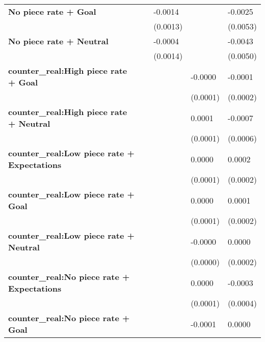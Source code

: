 \begin{tabular}{lllll}
\textbf{No piece rate + Goal                      } &                &        -0.0014 &                &        -0.0025 \\
                                           &                &       (0.0013) &                &       (0.0053) \\
\textbf{No piece rate + Neutral                   } &                &        -0.0004 &                &        -0.0043 \\
                                           &                &       (0.0014) &                &       (0.0050) \\
\textbf{counter\_real:High piece rate + Goal       } &                &                &        -0.0000 &        -0.0001 \\
                                           &                &                &       (0.0001) &       (0.0002) \\
\textbf{counter\_real:High piece rate + Neutral    } &                &                &         0.0001 &        -0.0007 \\
                                           &                &                &       (0.0001) &       (0.0006) \\
\textbf{counter\_real:Low piece rate + Expectations} &                &                &         0.0000 &         0.0002 \\
                                           &                &                &       (0.0001) &       (0.0002) \\
\textbf{counter\_real:Low piece rate + Goal        } &                &                &         0.0000 &         0.0001 \\
                                           &                &                &       (0.0001) &       (0.0002) \\
\textbf{counter\_real:Low piece rate + Neutral     } &                &                &        -0.0000 &         0.0000 \\
                                           &                &                &       (0.0000) &       (0.0002) \\
\textbf{counter\_real:No piece rate + Expectations } &                &                &         0.0000 &        -0.0003 \\
                                           &                &                &       (0.0001) &       (0.0004) \\
\textbf{counter\_real:No piece rate + Goal         } &                &                &        -0.0001 &         0.0000 \\

\end{tabular}

